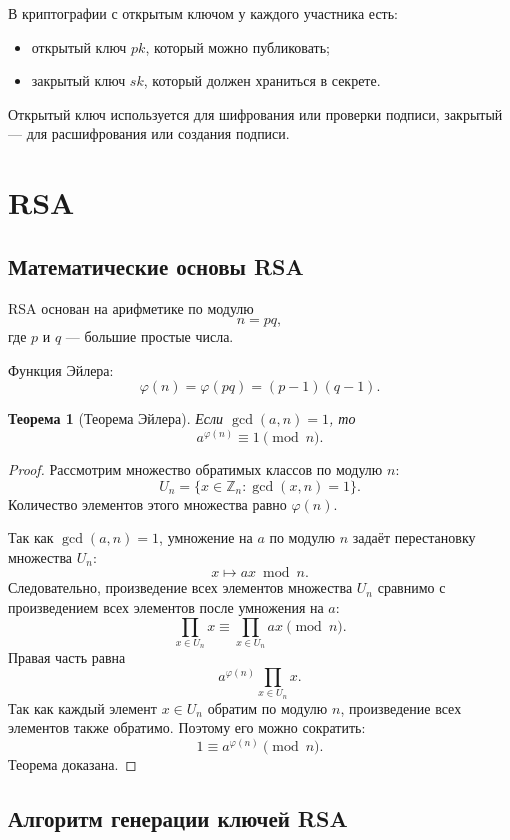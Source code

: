 \documentclass[12pt,a4paper]{article}
\newtheorem{theorem}{Теорема}
\begin{document}
В криптографии с открытым ключом у каждого участника есть:

\begin{itemize}
    \item открытый ключ $pk$, который можно публиковать;
    \item закрытый ключ $sk$, который должен храниться в секрете.
\end{itemize}

Открытый ключ используется для шифрования или проверки подписи, закрытый --- для расшифрования или создания подписи.

\section{RSA}

\subsection{Математические основы RSA}

RSA основан на арифметике по модулю
\[
    n=pq,
\]
где $p$ и $q$ --- большие простые числа.

Функция Эйлера:
\[
    \varphi(n)=\varphi(pq)=(p-1)(q-1).
\]

\begin{theorem}[Теорема Эйлера]
Если $\gcd(a,n)=1$, то
\[
    a^{\varphi(n)}\equiv 1 \pmod n.
\]
\end{theorem}

\begin{proof}
Рассмотрим множество обратимых классов по модулю $n$:
\[
    U_n=\{x \in \mathbb{Z}_n : \gcd(x,n)=1\}.
\]
Количество элементов этого множества равно $\varphi(n)$.

Так как $\gcd(a,n)=1$, умножение на $a$ по модулю $n$ задаёт перестановку множества $U_n$:
\[
    x \mapsto ax \bmod n.
\]
Следовательно, произведение всех элементов множества $U_n$ сравнимо с произведением всех элементов после умножения на $a$:
\[
    \prod_{x\in U_n} x \equiv \prod_{x\in U_n} ax \pmod n.
\]
Правая часть равна
\[
    a^{\varphi(n)}\prod_{x\in U_n}x.
\]
Так как каждый элемент $x\in U_n$ обратим по модулю $n$, произведение всех элементов также обратимо. Поэтому его можно сократить:
\[
    1\equiv a^{\varphi(n)} \pmod n.
\]
Теорема доказана.
\end{proof}

\subsection{Алгоритм генерации ключей RSA}
\end{document}
